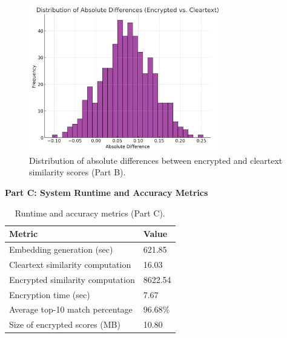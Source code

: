 \documentclass[12pt,a4paper]{article}
\begin{document}
\begin{figure}[H]
    \centering
    \includegraphics[width=0.75\textwidth]{./elements/Distribution of Absolute Differences (Encrypted vs. Cleartext).png}
    \caption{Distribution of absolute differences between encrypted and cleartext similarity scores (Part B).}
    \label{fig:dist_abs_diff}
\end{figure}

\bigskip
\noindent
\textbf{Part C: System Runtime and Accuracy Metrics}

\begin{table}[H]
    \centering
    \begin{tabular}{|l|l|}
    \hline
    Metric                           & Value   \\ \hline
    Embedding generation (sec)       & 621.85  \\ \hline
    Cleartext similarity computation & 16.03   \\ \hline
    Encrypted similarity computation & 8622.54 \\ \hline
    Encryption time (sec)            & 7.67    \\ \hline
    Average top-10 match percentage  & 96.68\% \\ \hline
    Size of encrypted scores (MB)    & 10.80   \\ \hline
    \end{tabular}
    \caption{Runtime and accuracy metrics (Part C).}
    \label{tab:partC_metrics}
\end{table}
\end{document}
